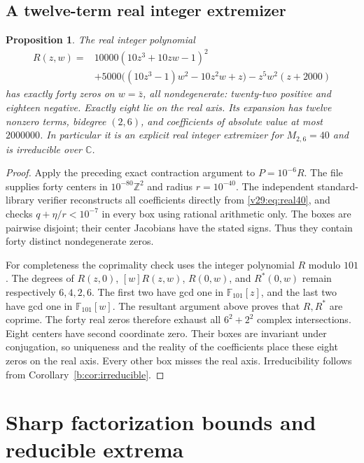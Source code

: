 \documentclass[UTF8,11pt]{ctexart}
\newtheorem{prop}[thm]{Proposition}
\theoremstyle{definition}
\numberwithin{equation}{section}
\newcommand{\C}{\mathbb C}\newcommand{\R}{\mathbb R}
\begin{document}
\subsection{A twelve-term real integer extremizer}
\begin{prop}\label{v29:prop:real40}
The real integer polynomial
\begin{equation}\label{v29:eq:real40}
\begin{split}
 R(z,w)={}&10000(10z^3+10zw-1)^2\\
         &+5000\bigl((10z^3-1)w^2-10z^2w+z\bigr)
           -z^5w^2(z+2000)
\end{split}
\end{equation}
has exactly forty zeros on $w=\bar z$, all nondegenerate:
twenty-two positive and eighteen negative. Exactly eight lie on
the real axis. Its expansion has twelve nonzero terms, bidegree
$(2,6)$, and coefficients of absolute value at most $2000000$.
In particular it is an explicit real integer extremizer for
$M_{2,6}=40$ and is irreducible over $\C$.
\end{prop}
\begin{proof}
Apply the preceding exact contraction argument to $P=10^{-6}R$.
The file  supplies forty centers
in $10^{-80}\mathbb Z^2$ and radius $r=10^{-40}$.
The independent standard-library verifier
 reconstructs all coefficients directly
from \eqref{v29:eq:real40}, and checks
$q+\eta/r<10^{-7}$ in every box using rational arithmetic only.
The boxes are pairwise disjoint; their center Jacobians have the
stated signs. Thus they contain forty distinct nondegenerate zeros.

For completeness the coprimality check uses the integer polynomial
$R$ modulo $101$. The degrees of $R(z,0)$, $[w]R(z,w)$,
$R(0,w)$, and $R^*(0,w)$ remain respectively $6,4,2,6$.
The first two have gcd one in $\mathbb F_{101}[z]$, and the last
two have gcd one in $\mathbb F_{101}[w]$. The resultant argument
above proves that $R,R^*$ are coprime. The forty real zeros
therefore exhaust all $6^2+2^2$ complex intersections.
Eight centers have second coordinate zero. Their boxes are invariant
under conjugation, so uniqueness and the reality of the coefficients
place these eight zeros on the real axis. Every other box misses
the real axis. Irreducibility follows from
Corollary~\ref{b:cor:irreducible}.
\end{proof}

\section{Sharp factorization bounds and reducible extrema}
\label{v8:sec:factorization}
\end{document}
